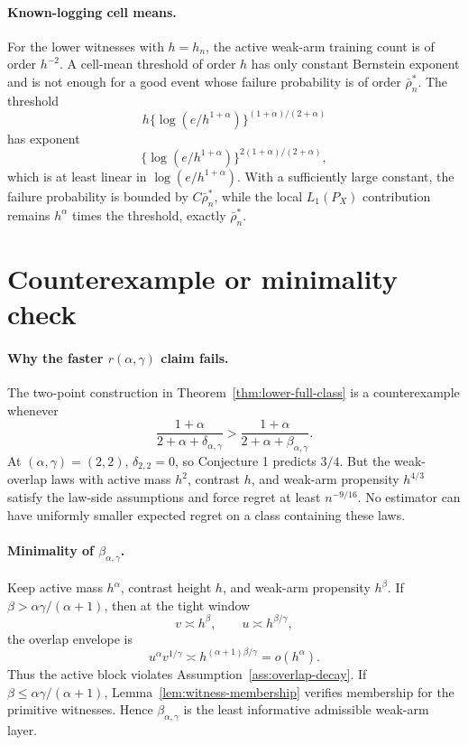 \documentclass[11pt]{article}
\theoremstyle{definition}
\theoremstyle{plain}
\theoremstyle{remark}
\begin{document}
\paragraph{Known-logging cell means.}
For the lower witnesses with \(h=h_n\), the active weak-arm training count is
of order \(h^{-2}\).  A cell-mean threshold of order \(h\) has only constant
Bernstein exponent and is not enough for a good event whose failure
probability is of order \(\bar\rho_n^*\).  The threshold
\[
h\{\log(e/h^{1+\alpha})\}^{(1+\alpha)/(2+\alpha)}
\]
has exponent
\[
\{\log(e/h^{1+\alpha})\}^{2(1+\alpha)/(2+\alpha)},
\]
which is at least linear in \(\log(e/h^{1+\alpha})\).  With a sufficiently
large constant, the failure probability is bounded by
\(C\bar\rho_n^*\), while the local \(L_1(P_X)\) contribution remains
\(h^\alpha\) times the threshold, exactly \(\bar\rho_n^*\).

\section{Counterexample or minimality check}
\paragraph{Why the faster \(r(\alpha,\gamma)\) claim fails.}
The two-point construction in Theorem~\ref{thm:lower-full-class} is a
counterexample whenever
\[
\frac{1+\alpha}{2+\alpha+\delta_{\alpha,\gamma}}
>
\frac{1+\alpha}{2+\alpha+\beta_{\alpha,\gamma}}.
\]
At \((\alpha,\gamma)=(2,2)\), \(\delta_{2,2}=0\), so Conjecture 1 predicts
\(3/4\).  But the weak-overlap laws with active mass \(h^2\), contrast
\(h\), and weak-arm propensity \(h^{4/3}\) satisfy the law-side assumptions
and force regret at least \(n^{-9/16}\).  No estimator can have uniformly
smaller expected regret on a class containing these laws.

\paragraph{Minimality of \(\beta_{\alpha,\gamma}\).}
Keep active mass \(h^\alpha\), contrast height \(h\), and weak-arm propensity
\(h^\beta\).  If \(\beta>\alpha\gamma/(\alpha+1)\), then at the tight window
\[
v\asymp h^\beta,\qquad u\asymp h^{\beta/\gamma},
\]
the overlap envelope is
\[
u^\alpha v^{1/\gamma}
\asymp h^{(\alpha+1)\beta/\gamma}
=o(h^\alpha).
\]
Thus the active block violates Assumption~\ref{ass:overlap-decay}.  If
\(\beta\le\alpha\gamma/(\alpha+1)\), Lemma~\ref{lem:witness-membership}
verifies membership for the primitive witnesses.  Hence
\(\beta_{\alpha,\gamma}\) is the least informative admissible weak-arm layer.
\end{document}
